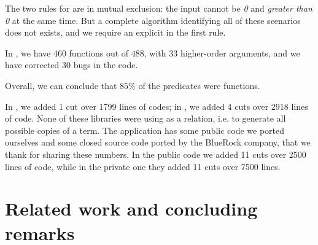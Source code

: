 The two rules for  are in mutual exclusion:
the input cannot be \textit{0} and \textit{greater than 0} at the same time.
But a complete algorithm identifying all of these scenarios does not exists,
and we require an explicit \cut in the first rule.

In \hb, we have $460$ functions out of $488$, with $33$
higher-order arguments, and we have corrected $30$ bugs in the code.

Overall, we can conclude that $85\%$ of the predicates were functions.

In , we
added 1 cut over 1799 lines of codes; in \trocq, we added 4 cuts over 2918
lines of code.  None of these libraries were using  as a relation, i.e. to
generate all possible copies of a term.
The  application has some public code we ported
ourselves and some closed source code ported by the BlueRock company, that we
thank for sharing these numbers.
In the public code we added 11 cuts over 2500 lines of
code, while in the private one they added 11 cuts over 7500 lines.






\section{Related work and concluding remarks}

